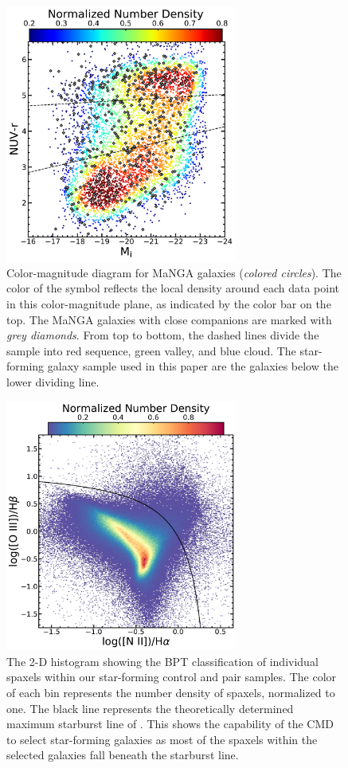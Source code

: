 \documentclass[iop,revtex4,twocolumn,apj,numberedappendix,appendixfloats]{emulateapj}
\begin{document}
\begin{figure}
\centering
\includegraphics[width=3in]{fig/color-mag.pdf}
\caption[Color-magnitude distribution of the MaNGA galaxies]{Color-magnitude diagram for MaNGA galaxies ({\it colored circles}). The color of the symbol reflects the local density around each data point in this color-magnitude plane, as indicated by the color bar on the top. The MaNGA galaxies with close companions are marked with {\it grey diamonds}. From top to bottom, the dashed lines divide the sample into red sequence, green valley, and blue cloud. The star-forming galaxy sample used in this paper are the galaxies below the lower dividing line.}
\label{fig:CMD}
\end{figure}

\begin{figure}
\centering
\includegraphics[width=3in]{fig/bpt_spax.pdf}
\caption[BPT classification of MaNGA spaxels.]{The 2-D histogram showing the BPT classification \citep{Baldwin:1981} of individual spaxels within our star-forming control and pair samples. The color of each bin represents the number density of spaxels, normalized to one. The black line represents the theoretically determined maximum starburst line of \citet{Kewley:2001}. This shows the capability of the CMD to select star-forming galaxies as most of the spaxels within the selected galaxies fall beneath the starburst line.}
\label{fig:bpt_spax}
\end{figure}
\end{document}
